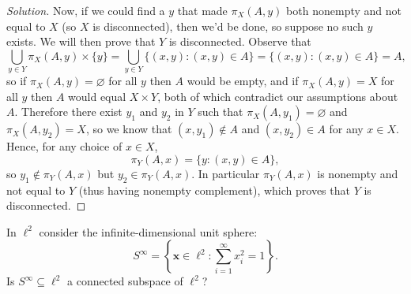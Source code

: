 \documentclass[11pt]{scrartcl}
\providecommand{\mb}[1]{\mathbf{#1}}
\newenvironment{soln}{\begin{proof}[Solution]}{\end{proof}}
\begin{document}
\begin{soln}
	Now, if we could find a $y$ that made $\pi_X(A, y)$ both nonempty
	and not equal to $X$ (so $X$ is disconnected),
	then we'd be done, so suppose no such $y$ exists.
	We will then prove that $Y$ is disconnected.
	Observe that
	\[\bigcup_{y\in Y} \pi_X(A,y)\times\{y\} =
	\bigcup_{y\in Y} \{(x,y) : (x, y)\in A\}
	= \{(x,y) : (x,y)\in A\} = A,\]
	so if $\pi_X(A,y) = \varnothing$ for all $y$ then $A$ would be empty,
	and if $\pi_X(A,y) = X$ for all $y$ then $A$ would equal $X\times Y$,
	both of which contradict our assumptions about $A$.
	Therefore there exist $y_1$ and $y_2$ in $Y$ such that
	$\pi_X(A, y_1) = \varnothing$ and $\pi_X(A, y_2) = X$,
	so we know that $(x, y_1)\notin A$ and $(x, y_2)\in A$ for any $x\in X$.
	Hence, for any choice of $x\in X$,
	\[\pi_Y(A, x) = \{y: (x,y)\in A\},\]
	so $y_1\notin\pi_Y(A, x)$ but $y_2\in\pi_Y(A, x)$.
	In particular $\pi_Y(A, x)$ is nonempty and not equal to $Y$
	(thus having nonempty complement), which proves that $Y$ is disconnected.
\end{soln}

\begin{problem}
	In $\ell^2$ consider the infinite-dimensional unit sphere:
	\[S^\infty = \left\{\mb x\in\ell^2 : \sum_{i=1}^\infty x_i^2 = 1\right\}.\]
	Is $S^\infty\subseteq\ell^2$ a connected subspace of $\ell^2$?
\end{problem}
\end{document}
